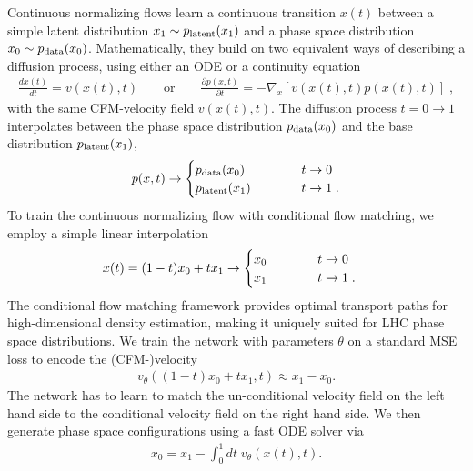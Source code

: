 \documentclass[submission, Phys]{SciPost}
\begin{document}
Continuous normalizing flows learn a continuous transition $x(t)$ between a simple latent distribution $x_1\sim p_\text{latent} (x_1)$ and a phase space distribution $x_0\sim p_\text{data} (x_0)$. Mathematically, they build on two equivalent ways of describing a diffusion process, using either an ODE or a continuity equation~\cite{Plehn:2022ftl,Butter:2023fov}
%
\begin{align}
  \frac{dx(t)}{dt} = v(x(t),t)
  \qquad \text{or} \qquad 
\frac{\partial p(x,t)}{\partial t} 
= - \nabla_x \left[ v(x(t),t) p(x(t),t) \right] \; ,
\label{eq:ode}
\end{align}
%
with the same CFM-velocity field $v(x(t),t)$. The diffusion process $t = 0 \to 1$ interpolates between the phase space distribution $p_\text{data} (x_0)$ and the base distribution $p_\text{latent} (x_1)$,
%
\begin{align}
 p(x,t) \to 
 \begin{cases}
  p_\text{data}(x_0) \qquad\quad & t \to 0 \\
  p_\text{latent}(x_1) \qquad\quad & t \to 1  \; .
 \end{cases} 
\label{eq:fm_limits}
\end{align}
%
To train the continuous normalizing flow with conditional flow matching, we employ a simple linear interpolation
%
\begin{align}
    x(t) 
    &= (1-t) x_0 + t x_1 
    \to \begin{cases}
      x_0 \qquad\quad & t \to 0 \\
      x_1 \qquad\quad & t \to 1  \; .
    \end{cases} 
    \label{eq:cfm_target}
\end{align}
%
The conditional flow matching framework provides optimal transport paths for high-dimensional density estimation, making it uniquely suited for LHC phase space distributions. We train the network with parameters $\theta$ on a standard MSE loss to encode the (CFM-)velocity
%
\begin{align}
v_\theta \left((1-t)x_0 + tx_1,t\right) \approx x_1 - x_0.
\end{align}
%
The network has to learn to match the un-conditional velocity field on the left hand side to the conditional velocity field on the right hand side. We then generate phase space
configurations using a fast ODE solver via 
%
\begin{align}
    x_0 = x_1 - \int_0^1 dt\; v_\theta(x(t),t).
\end{align}
%

\end{document}
